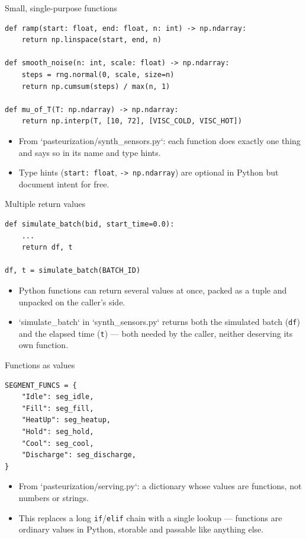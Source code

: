 \begin{frame}[fragile]{Small, single-purpose functions}
\begin{lstlisting}[style=coursepython]
def ramp(start: float, end: float, n: int) -> np.ndarray:
    return np.linspace(start, end, n)

def smooth_noise(n: int, scale: float) -> np.ndarray:
    steps = rng.normal(0, scale, size=n)
    return np.cumsum(steps) / max(n, 1)

def mu_of_T(T: np.ndarray) -> np.ndarray:
    return np.interp(T, [10, 72], [VISC_COLD, VISC_HOT])
\end{lstlisting}
\begin{itemize}
\item From `pasteurization/synth\_sensors.py`: each function does exactly one thing and says so in its name and type hints.
\item Type hints (\texttt{start: float}, \texttt{-> np.ndarray}) are optional in Python but document intent for free.
\end{itemize}
\coursefooter
\end{frame}

\begin{frame}[fragile]{Multiple return values}
\begin{lstlisting}[style=coursepython]
def simulate_batch(bid, start_time=0.0):
    ...
    return df, t

df, t = simulate_batch(BATCH_ID)
\end{lstlisting}
\begin{itemize}
\item Python functions can return several values at once, packed as a tuple and unpacked on the caller's side.
\item `simulate_batch` in `synth\_sensors.py` returns both the simulated batch (\texttt{df}) and the elapsed time (\texttt{t}) --- both needed by the caller, neither deserving its own function.
\end{itemize}
\coursefooter
\end{frame}

\begin{frame}[fragile]{Functions as values}
\begin{lstlisting}[style=coursepython]
SEGMENT_FUNCS = {
    "Idle": seg_idle,
    "Fill": seg_fill,
    "HeatUp": seg_heatup,
    "Hold": seg_hold,
    "Cool": seg_cool,
    "Discharge": seg_discharge,
}
\end{lstlisting}
\begin{itemize}
\item From `pasteurization/serving.py`: a dictionary whose values are functions, not numbers or strings.
\item This replaces a long \texttt{if}/\texttt{elif} chain with a single lookup --- functions are ordinary values in Python, storable and passable like anything else.
\end{itemize}
\coursefooter
\end{frame}


